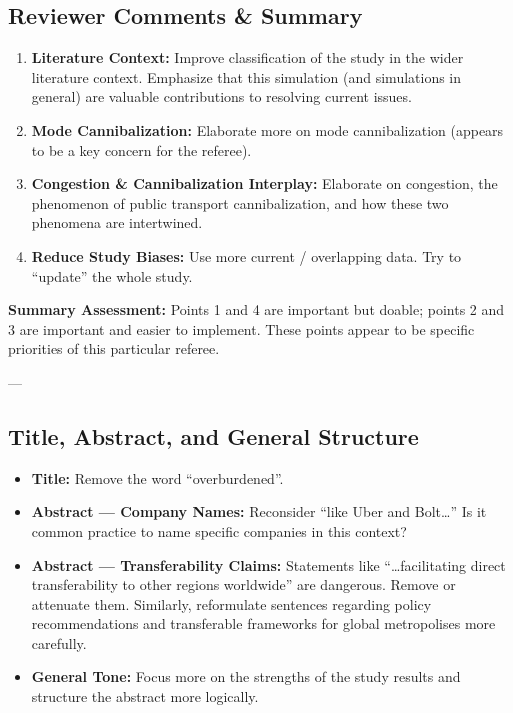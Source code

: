 \documentclass[11pt, a4paper]{article}
\begin{document}
\subsection{Reviewer Comments \& Summary}
\begin{enumerate}
    \item \textbf{Literature Context:} Improve classification of the study in the wider literature context. Emphasize that this simulation (and simulations in general) are valuable contributions to resolving current issues.
    \item \textbf{Mode Cannibalization:} Elaborate more on mode cannibalization (appears to be a key concern for the referee).
    \item \textbf{Congestion \& Cannibalization Interplay:} Elaborate on congestion, the phenomenon of public transport cannibalization, and how these two phenomena are intertwined.
    \item \textbf{Reduce Study Biases:} Use more current / overlapping data. Try to ``update'' the whole study.
\end{enumerate}

\noindent\textbf{Summary Assessment:} Points 1 and 4 are important but doable; points 2 and 3 are important and easier to implement. These points appear to be specific priorities of this particular referee.

---

\subsection{Title, Abstract, and General Structure}

\begin{itemize}
    \item \textbf{Title:} Remove the word ``overburdened''.
    \item \textbf{Abstract --- Company Names:} Reconsider ``like Uber and Bolt\dots'' Is it common practice to name specific companies in this context?
    \item \textbf{Abstract --- Transferability Claims:} Statements like ``\dots facilitating direct transferability to other regions worldwide'' are dangerous. Remove or attenuate them. Similarly, reformulate sentences regarding policy recommendations and transferable frameworks for global metropolises more carefully.
    \item \textbf{General Tone:} Focus more on the strengths of the study results and structure the abstract more logically.
\end{itemize}
\end{document}

